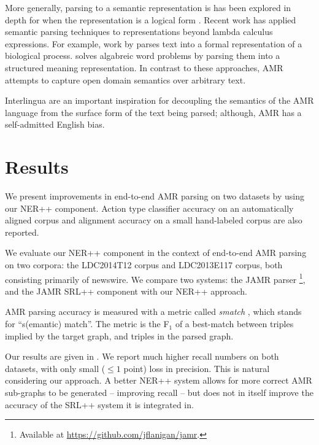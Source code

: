 \documentclass[11pt]{article}
\newcommand\w[1]{\textit{#1}} %
\begin{document}
More generally, parsing to a semantic representation is has been explored in
  depth for when the representation is a logical form
  \cite{2005kate-semantics,2005zettlemoyer-semantics,2011liang-semantics}.
Recent work has applied semantic parsing techniques to representations beyond
  lambda calculus expressions.
For example, work by  parses
  text into a formal representation of a biological process.
 solves algabreic word problems by parsing them
  into a structured meaning representation.
In contrast to these approaches, AMR attempts to capture open domain semantics
  over arbitrary text.

Interlingua
  \cite{1991mitamura-interlingua,1999carbonell-interlingua,1998levin-interlingua}
  are an important inspiration for decoupling the semantics of the AMR language
  from the surface form of the text being parsed; although, AMR has a self-admitted
  English bias.




\section{Results}
We present improvements in end-to-end AMR parsing on two datasets by using our NER++ component.
Action type classifier accuracy on an automatically aligned corpus
and alignment accuracy on a small hand-labeled corpus are also reported.

We evaluate our NER++ component in the context of end-to-end AMR parsing
on two corpora: the LDC2014T12 corpus and LDC2013E117 corpus, both consisting
  primarily of newswire.
We compare two systems: the JAMR parser \cite{2014flanigan-amr}
\footnote{Available at \url{https://github.com/jflanigan/jamr}.},
  and the JAMR SRL++ component with our NER++ approach.

AMR parsing accuracy is measured with a metric called \w{smatch} \cite{cai2013smatch-amr}, which stands 
  for ``s(emantic) match''. 
The metric is the F$_1$ of a best-match between triples implied by the target graph, 
  and triples in the parsed graph. 

Our results are given in .
We report much higher recall numbers on both datasets, with only small ($\leq 1$ point) 
  loss in precision.
This is natural considering our approach.
A better NER++ system allows for more correct AMR sub-graphs to be generated --
  improving recall -- but does not in itself improve the accuracy of the
  SRL++ system it is integrated in.
\end{document}
